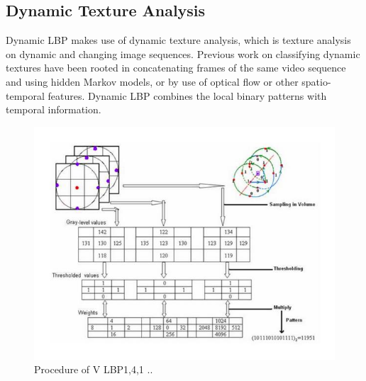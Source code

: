 \documentclass[12pt,twoside]{report}
\begin{document}
		\subsection{Dynamic Texture Analysis}
Dynamic LBP makes use of dynamic texture analysis, which is texture analysis on dynamic and changing image sequences. Previous work on classifying dynamic textures have been rooted in concatenating frames of the same video sequence and using hidden Markov models, or by use of optical flow or other spatio-temporal features. Dynamic LBP combines the local binary patterns with temporal information. 

\begin{figure}[tb]
\centering
\includegraphics[width = 1.0\hsize]{./figures/VLBPprocedure}
\caption{ Procedure of V LBP1,4,1 ..}
\label{fig:logo}
\end{figure}
\end{document}
